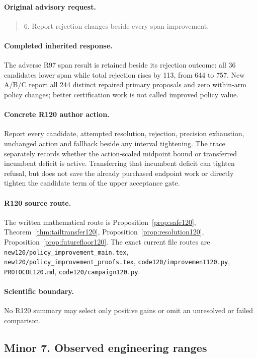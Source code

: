 \paragraph{Original advisory request.}
\begin{quote}
6. Report rejection changes beside every span improvement.
\end{quote}
\paragraph{Completed inherited response.}
The adverse R97 span result is retained beside its rejection outcome: all 36 candidates lower span while total rejection rises by 113, from 644 to 757. New A/B/C report all 244 distinct repaired primary proposals and zero within-arm policy changes; better certification work is not called improved policy value.
\paragraph{Concrete R120 author action.}
Report every candidate, attempted resolution, rejection, precision exhaustion, unchanged action and fallback beside any interval tightening. The trace separately records whether the action-scaled midpoint bound or transferred incumbent deficit is active. Transferring that incumbent deficit can tighten refusal, but does not save the already purchased endpoint work or directly tighten the candidate term of the upper acceptance gate.
\paragraph{R120 source route.}
The written mathematical route is Proposition~\ref{prop:safe120}, Theorem~\ref{thm:tailtransfer120}, Proposition~\ref{prop:resolution120}, Proposition~\ref{prop:futurefloor120}. The exact current file routes are \nolinkurl{new120/policy_improvement_main.tex}, \nolinkurl{new120/policy_improvement_proofs.tex}, \nolinkurl{code120/improvement120.py}, \nolinkurl{PROTOCOL120.md}, \nolinkurl{code120/campaign120.py}.
\paragraph{Scientific boundary.}
No R120 summary may select only positive gains or omit an unresolved or failed comparison.

\subsection{Minor 7. Observed engineering ranges}
\label{response120:minor-7}
